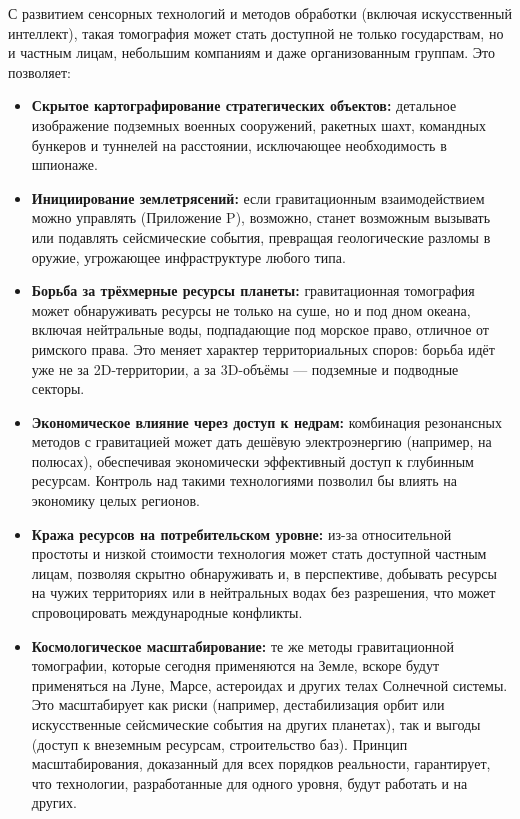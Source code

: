 \documentclass[12pt,a4paper]{article}
\theoremstyle{remark}
\begin{document}
	С развитием сенсорных технологий и методов обработки (включая искусственный интеллект), такая томография может стать доступной не только государствам, но и частным лицам, небольшим компаниям и даже организованным группам. Это позволяет:
	\begin{itemize}[leftmargin=*]
		\item \textbf{Скрытое картографирование стратегических объектов:} детальное изображение подземных военных сооружений, ракетных шахт, командных бункеров и туннелей на расстоянии, исключающее необходимость в шпионаже.
		\item \textbf{Инициирование землетрясений:} если гравитационным взаимодействием можно управлять (Приложение P), возможно, станет возможным вызывать или подавлять сейсмические события, превращая геологические разломы в оружие, угрожающее инфраструктуре любого типа.
		\item \textbf{Борьба за трёхмерные ресурсы планеты:} гравитационная томография может обнаруживать ресурсы не только на суше, но и под дном океана, включая нейтральные воды, подпадающие под морское право, отличное от римского права. Это меняет характер территориальных споров: борьба идёт уже не за 2D-территории, а за 3D-объёмы — подземные и подводные секторы.
		\item \textbf{Экономическое влияние через доступ к недрам:} комбинация резонансных методов с гравитацией может дать дешёвую электроэнергию (например, на полюсах), обеспечивая экономически эффективный доступ к глубинным ресурсам. Контроль над такими технологиями позволил бы влиять на экономику целых регионов.
		\item \textbf{Кража ресурсов на потребительском уровне:} из-за относительной простоты и низкой стоимости технология может стать доступной частным лицам, позволяя скрытно обнаруживать и, в перспективе, добывать ресурсы на чужих территориях или в нейтральных водах без разрешения, что может спровоцировать международные конфликты.
		\item \textbf{Космологическое масштабирование:} те же методы гравитационной томографии, которые сегодня применяются на Земле, вскоре будут применяться на Луне, Марсе, астероидах и других телах Солнечной системы. Это масштабирует как риски (например, дестабилизация орбит или искусственные сейсмические события на других планетах), так и выгоды (доступ к внеземным ресурсам, строительство баз). Принцип масштабирования, доказанный для всех порядков реальности, гарантирует, что технологии, разработанные для одного уровня, будут работать и на других.
	\end{itemize}
	
\end{document}
